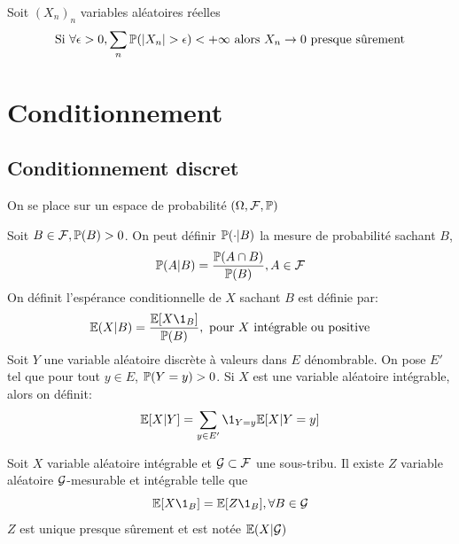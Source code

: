 \documentclass[]{report}
\begin{document}
    \begin{exo}{}{}
        
    \end{exo}

    \begin{exo}{}{}
        Soit $(X_n)_n$ variables aléatoires réelles
        \[\text{Si }\forall \epsilon>0,\sum_n \Pa(|X_n|>\epsilon)<+\infty\text{ alors }X_n\to 0\text{ presque sûrement}\]
    \end{exo}
    
    \chapter{Conditionnement}

    \section{Conditionnement discret}

    On se place sur un espace de probabilité $(\Omega,\mathcal{F},\mathbb{P})$

    \begin{df}{}{}
        Soit $B\in \mathcal{F},\mathbb{P}(B)>0$. On peut définir $\mathbb{P}(\cdot |B)$ la mesure de probabilité sachant $B$,
        \[\mathbb{P}(A|B)=\frac{\mathbb{P}(A\cap B)}{\mathbb{P}(B)},A\in \mathcal{F}\]
        On définit l'espérance conditionnelle de $X$ sachant $B$ est définie par:
        \[\Ea(X|B)=\frac{\Ea[X\1_B]}{\Pa(B)},\text{ pour $X$ intégrable ou positive}\]
        Soit $Y$ une variable aléatoire discrète à valeurs dans $E$ dénombrable. On pose $E'$ tel que pour tout $y\in E$, $\mathbb{P}(Y=y)>0$. Si $X$ est une variable aléatoire intégrable, alors on définit:
        \[\Ea[X|Y]=\sum_{y\in E'}\1_{Y=y}\Ea[X|Y=y]\]
    \end{df}

     \begin{prop}{}{}
        Soit $X$ variable aléatoire intégrable et $\mathcal{G}\subset \mathcal{F}$ une sous-tribu. Il existe $Z$ variable aléatoire $\mathcal{G}$-mesurable et intégrable telle que
        \[\Ea[X\1_B]=\Ea[Z\1_B],\forall B\in \Gr\]
        $Z$ est unique presque sûrement et est notée $\mathbb{E}(X|\mathcal{G})$
    \end{prop}
\end{document}
